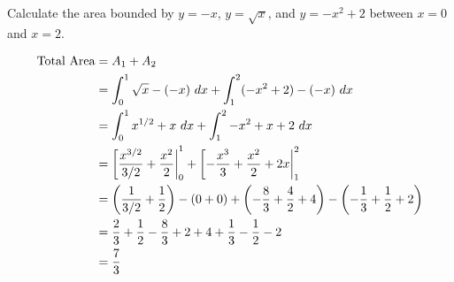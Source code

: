 \begin{exercise}\nonumber
    Calculate the area bounded by $ y = -x $, $ y = \sqrt{x} $, and $ y = -x^2 + 2 $ between $ x = 0 $ and $ x = 2 $. \\

    \begin{figure}[H]
        \centering
    \end{figure}

    \begin{align}
        \text{Total Area} & = A_1 + A_2                                                                                                                                      \\
                          & = \int_0^1 \sqrt{x} - (-x) \ dx + \int_1^2 (-x^2 + 2) - (-x) \ dx                                                                                \\
                          & = \int_0^1 x^{1/2} + x \ dx + \int_1^2 -x^2 + x + 2 \ dx                                                                                         \\
                          & = \left[ {{x^{3/2}} \over {3/2}} + {x^2 \over 2} \right|_0^1 + \left[ -{{x^3} \over 3} + {x^2 \over 2} + 2x \right|_1^2                          \\
                          & = \left({1 \over 3/2} + {1 \over 2}\right) - (0 + 0) + \left(-{8 \over 3} + {4 \over 2} + 4\right) - \left(-{1 \over 3} + {1 \over 2} + 2\right) \\
                          & = {2 \over 3} + {1 \over 2} - {8 \over 3} + 2 + 4 + {1 \over 3} - {1 \over 2} - 2                                                                \\
                          & = {7 \over 3}
    \end{align}
\end{exercise}

